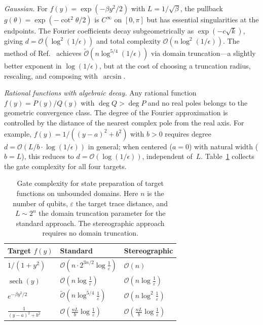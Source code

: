 \textit{Gaussian.}
For $f(y) = \exp(-\beta y^2/2)$ with $L = 1/\sqrt{\beta}$,
the pullback $g(\theta) = \exp(-\cot^2\theta/2)$ is
$C^\infty$ on $[0,\pi]$ but has essential singularities at
the endpoints.  The Fourier coefficients decay
subgeometrically as $\exp(-c\sqrt{k})$, giving
$d = \mathcal{O}(\log^2(1/\epsilon))$ and total complexity
$\mathcal{O}(n\log^2(1/\epsilon))$.  The method of
Ref.~\cite{McArdleGilyenBerta2025} achieves
$\tilde{\mathcal{O}}(n\log^{5/4}(1/\epsilon))$ via domain
truncation---a slightly better exponent in
$\log(1/\epsilon)$, but at the cost of choosing a truncation
radius, rescaling, and composing with~$\arcsin$.

\textit{Rational functions with algebraic decay.}
Any rational function $f(y) = P(y)/Q(y)$ with
$\deg Q > \deg P$ and no real poles belongs to the geometric
convergence class.  The degree of the Fourier approximation is
controlled by the distance of the nearest complex pole from the
real axis.  For example, $f(y) = 1/((y-a)^2+b^2)$ with
$b > 0$ requires degree
$d = \mathcal{O}(L/b \cdot \log(1/\epsilon))$ in general;
when centered ($a = 0$) with natural width ($b = L$), this
reduces to $d = \mathcal{O}(\log(1/\epsilon))$, independent
of~$L$.  Table~\ref{tab:state-prep-comparison} collects the
gate complexity for all four targets.

\begin{table}[t]
	\caption{Gate complexity for state preparation of target
	functions on unbounded domains.  Here $n$ is the number of
	qubits, $\varepsilon$ the target trace distance, and
	$L \sim 2^n$ the domain truncation parameter for the
	standard approach.  The stereographic approach requires no
	domain truncation.}
	\label{tab:state-prep-comparison}
	\begin{ruledtabular}
		\begin{tabular}{lll}
			Target $f(y)$
			 & Standard~\cite{McArdleGilyenBerta2025}
			 & Stereographic                                            \\
			\hline
			$1/(1+y^2)$
			 & $\mathcal{O}(n\cdot 2^{3n/2}\log\frac{1}{\varepsilon})$
			 & $\mathcal{O}(n)$                                         \\[4pt]
			$\operatorname{sech}(y)$
			 & $\mathcal{O}(n\log\frac{1}{\varepsilon})$
			 & $\mathcal{O}(n\log\frac{1}{\varepsilon})$                \\[4pt]
			$e^{-\beta y^2/2}$
			 & $\tilde{\mathcal{O}}(n\log^{5/4}\frac{1}{\varepsilon})$
			 & $\mathcal{O}(n\log^2\frac{1}{\varepsilon})$              \\[4pt]
			$\frac{1}{(y-a)^2+b^2}$
			 & $\mathcal{O}(\frac{nL}{b}\log\frac{1}{\varepsilon})$
			 & $\mathcal{O}(\frac{nL}{b}\log\frac{1}{\varepsilon})$
		\end{tabular}
	\end{ruledtabular}
\end{table}

